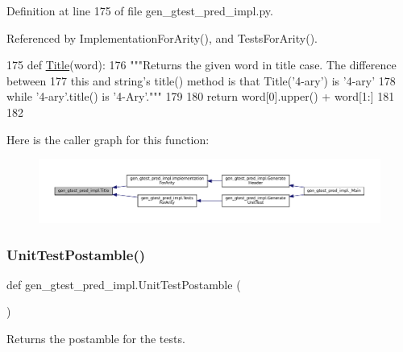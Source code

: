 Definition at line 175 of file gen\+\_\+gtest\+\_\+pred\+\_\+impl.\+py.



Referenced by Implementation\+For\+Arity(), and Tests\+For\+Arity().


\begin{DoxyCode}
175 \textcolor{keyword}{def }\hyperlink{namespacegen__gtest__pred__impl_ae49dd9bd9152dbcb3ca7994ce04c37ba}{Title}(word):
176   \textcolor{stringliteral}{"""Returns the given word in title case.  The difference between}
177 \textcolor{stringliteral}{  this and string's title() method is that Title('4-ary') is '4-ary'}
178 \textcolor{stringliteral}{  while '4-ary'.title() is '4-Ary'."""}
179 
180   \textcolor{keywordflow}{return} word[0].upper() + word[1:]
181 
182 
\end{DoxyCode}
Here is the caller graph for this function\+:
\nopagebreak
\begin{figure}[H]
\begin{center}
\leavevmode
\includegraphics[width=350pt]{namespacegen__gtest__pred__impl_ae49dd9bd9152dbcb3ca7994ce04c37ba_icgraph}
\end{center}
\end{figure}
\mbox{\label{namespacegen__gtest__pred__impl_a57b922f50d0807896496dcd883c1f098}} 
\subsubsection{\texorpdfstring{Unit\+Test\+Postamble()}{UnitTestPostamble()}}
{\footnotesize\ttfamily def gen\+\_\+gtest\+\_\+pred\+\_\+impl.\+Unit\+Test\+Postamble (\begin{DoxyParamCaption}{ }\end{DoxyParamCaption})}

\begin{DoxyVerb}Returns the postamble for the tests.\end{DoxyVerb}
 

